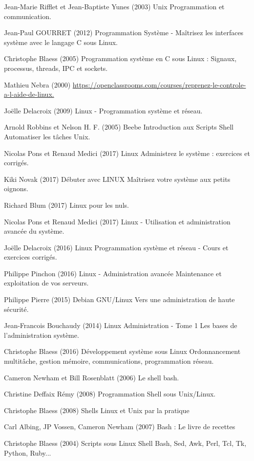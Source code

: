 \begin{thebibliography}{69}

 Jean-Marie Rifflet et Jean-Baptiste Yunes (2003) Unix Programmation et communication. 

 Jean-Paul GOURRET (2012) Programmation Système - Maîtrisez les interfaces système avec le langage C sous Linux.

 Christophe Blaess (2005) Programmation système en C sous Linux : Signaux, processus, threads, IPC et sockets.

 Mathieu Nebra (2000) \url{https://openclassrooms.com/courses/reprenez-le-controle-a-l-aide-de-linux.}

 Joëlle Delacroix (2009) Linux - Programmation système et réseau.

 Arnold Robbins et Nelson H. F. (2005) Beebe Introduction aux Scripts Shell Automatiser les tâches Unix.

 Nicolas Pons et Renaud Medici (2017) Linux Administrez le système : exercices et corrigés.

 Kiki Novak (2017) Débuter avec LINUX Maîtrisez votre système aux petits oignons.

 Richard Blum (2017) Linux pour les nuls.

 Nicolas Pons et Renaud Medici (2017) Linux - Utilisation et administration avancée du système.

 Joëlle Delacroix (2016) Linux Programmation système et réseau - Cours et exercices corrigés.

 Philippe Pinchon (2016) Linux - Administration avancée Maintenance et exploitation de vos serveurs.

 Philippe Pierre (2015) Debian GNU/Linux Vers une administration de haute sécurité.

 Jean-Francois Bouchaudy (2014) Linux Administration - Tome 1 Les bases de l'administration système.

 Christophe Blaess (2016) Développement système sous Linux Ordonnancement multitâche, gestion mémoire, communications, programmation réseau.

 Cameron Newham et Bill Rosenblatt (2006) Le shell bash.

 Christine Deffaix Rémy (2008) Programmation Shell sous Unix/Linux.

 Christophe Blaess (2008) Shells Linux et Unix par la pratique

 Carl Albing, JP Vossen, Cameron Newham (2007) Bash : Le livre de recettes

 Christophe Blaess (2004) Scripts sous Linux Shell Bash, Sed, Awk, Perl, Tcl, Tk, Python, Ruby...

\end{thebibliography}

